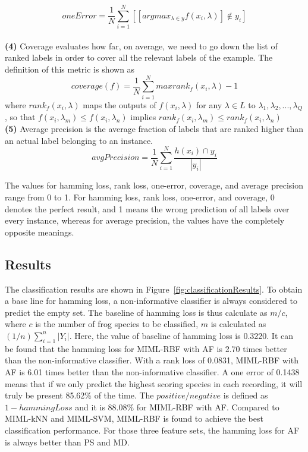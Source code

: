 \begin{equation}
oneError = \frac{1}{N}\sum_{i=1}^{N}[[argmax_{\lambda \in y} f(x_{i},\lambda)] \not \in y_{i} ]
\end{equation}
\\
\textbf{(4)} 
Coverage evaluates how far, on average, we need to go down
the list of ranked labels in order to cover all the relevant labels of the example. The definition of this metric is shown as
\begin{equation}
coverage(f)= \frac{1}{N}\sum_{i=1}^{N} max {rank_{f}(x_{i}, \lambda)-1}
\end{equation}
where $rank_{f}(x_{i}, \lambda)$ maps the outputs of $f(x_{i}, \lambda)$ for any
$\lambda \in L$ to ${\lambda_{1},\lambda_{2},...,\lambda_{Q}}$, so that 
$f(x_{i}, \lambda_{m}) \leq f(x_{i}, \lambda_{n})$ implies 
$rank_{f}(x_{i}, \lambda_{m}) \leq rank_{f}(x_{i}, \lambda_{n})$ 
\\
\textbf{(5)} 
Average precision is the average fraction of labels that are ranked higher than an actual label belonging to an instance. 
\begin{equation}
avgPrecision = \frac{1}{N}\sum_{i=1}^{N}\frac{h(x_{i}) \cap y_{i}}{|y_{i}|}
\end{equation}

The values for hamming loss, rank loss, one-error, coverage, and average precision range from 0 to 1. For hamming loss, rank loss, one-error, and coverage, 0 denotes the perfect result, and 1 means the wrong prediction of all labels over every instance, whereas for average precision, the values have the completely opposite meanings. 



\subsection{Results}

The classification results are shown in Figure~\ref{fig:classificationResults}. To obtain a base line for hamming loss, a non-informative classifier is always considered to predict the empty set. The baseline of hamming loss is thus calculate as $m/c$, where $c$ is the number of frog species to be classified, $m$ is calculated as $(1/n)\sum_{i=1}^{n}|Y_{i}|$. Here, the value of baseline of hamming loss is 0.3220. It can be found that the hamming loss for MIML-RBF with AF is 2.70 times better than the non-informative classifier. With a rank loss of 0.0831, MIML-RBF with AF is 6.01 times better than the non-informative classifier. A one error of 0.1438 means that if we only predict the highest scoring species in each recording, it will truly be present 85.62\% of the time. 
The $positive/negative$ is defined as $1-hammingLoss$ and it is 88.08\% for MIML-RBF with AF. Compared to MIML-kNN and MIML-SVM,  MIML-RBF is found to achieve the best classification performance. For those three feature sets, the hamming loss for AF is always better than PS and MD. 



